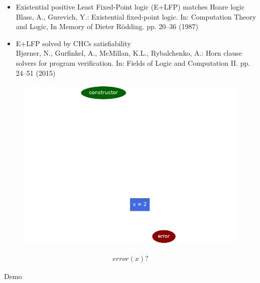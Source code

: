 \documentclass[aspectratio=169,10pt]{beamer}
\begin{document}
\begin{frame}
\begin{itemize}
	\item Existential positive Least Fixed-Point logic (E+LFP) matches Hoare logic\\Blass, A., Gurevich, Y.: Existential fixed-point logic. In: Computation Theory and Logic, In Memory of Dieter Rödding. pp. 20–36 (1987)
	\item E+LFP solved by CHCs satisfiability\\Bjørner, N., Gurfinkel, A., McMillan, K.L., Rybalchenko, A.: Horn clause solvers for program verification. In: Fields of Logic and Computation II. pp. 24–51 (2015)
\end{itemize}
\end{frame}

\begin{frame}[fragile]
\begin{figure}
\noindent\begin{minipage}{.49\textwidth}
	\includegraphics[scale=0.3]{images/state_machine_counterexample}
\end{minipage}
\noindent\begin{minipage}{.49\textwidth}
{\small
\begin{align*}
	error(x) ?
\end{align*}
}%
\end{minipage}
\end{figure}
\end{frame}

\begin{frame}
Demo
\end{frame}
\end{document}
